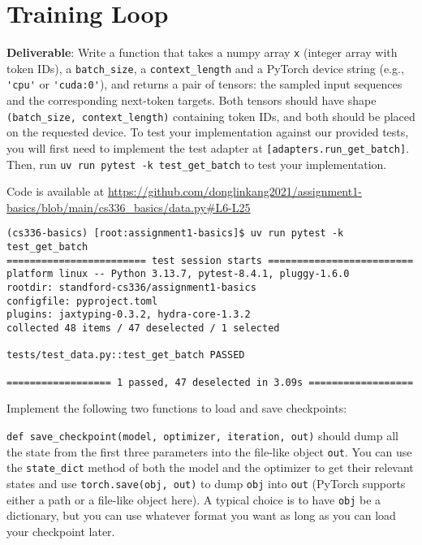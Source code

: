 \section{Training Loop}


\textbf{Deliverable}: Write a function that takes a numpy array \lstinline{x} (integer array with token IDs), a \lstinline{batch_size}, a \lstinline{context_length} and a PyTorch device string (e.g., \lstinline{'cpu'} or \lstinline{'cuda:0'}), and returns a pair of tensors: the sampled input sequences and the corresponding next-token targets. Both tensors should have shape \lstinline{(batch_size, context_length)} containing token IDs, and both should be placed on the requested device. To test your implementation against our provided tests, you will first need to implement the test adapter at \lstinline{[adapters.run_get_batch]}. Then, run \lstinline{uv run pytest -k test_get_batch} to test your implementation.

\begin{answer}
    Code is available at \url{https://github.com/donglinkang2021/assignment1-basics/blob/main/cs336_basics/data.py#L6-L25}
\end{answer}

\begin{lstlisting}
(cs336-basics) [root:assignment1-basics]$ uv run pytest -k test_get_batch
======================== test session starts =========================
platform linux -- Python 3.13.7, pytest-8.4.1, pluggy-1.6.0
rootdir: standford-cs336/assignment1-basics
configfile: pyproject.toml
plugins: jaxtyping-0.3.2, hydra-core-1.3.2
collected 48 items / 47 deselected / 1 selected                      

tests/test_data.py::test_get_batch PASSED

================== 1 passed, 47 deselected in 3.09s ==================
\end{lstlisting}


Implement the following two functions to load and save checkpoints:

\texttt{def save\_checkpoint(model, optimizer, iteration, out)} should dump all the state from the first three parameters into the file-like object \texttt{out}. You can use the \texttt{state\_dict} method of both the model and the optimizer to get their relevant states and use \texttt{torch.save(obj, out)} to dump \texttt{obj} into \texttt{out} (PyTorch supports either a path or a file-like object here). A typical choice is to have \texttt{obj} be a dictionary, but you can use whatever format you want as long as you can load your checkpoint later.

